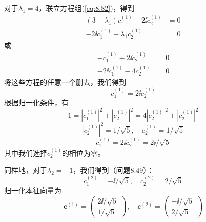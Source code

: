 \begin{examplebox}
        对于$\lambda_1=4$，联立方程组(\ref{eq:8.82})，得到
        \begin{equation*}
            \begin{aligned}
                \left(3-\lambda_1\right)c_1^{\left(1\right)} + 2\ii c_2^{\left(1\right)} &= 0 \\
                -2\ii c_1^{\left(1\right)} - \lambda_1 c_2^{\left(1\right)} &= 0
            \end{aligned}
        \end{equation*}
        或
        \begin{equation*}
            \begin{aligned}
                -c_1^{\left(1\right)} + 2\ii c_2^{\left(1\right)} &= 0 \\
                -2\ii c_1^{\left(1\right)} - 4c_2^{\left(1\right)} &= 0
            \end{aligned}
        \end{equation*}
        将这些方程的任意一个删去，我们得到
        \begin{equation*}
            c_1^{\left(1\right)} = 2\ii c_2^{\left(1\right)}
        \end{equation*}
        根据归一化条件，有
        \begin{equation*}
            1 = |c_1^{\left(1\right)}|^2 + |c_2^{\left(1\right)}|^2 = 4|c_2^{\left(1\right)}|^2 + |c_2^{\left(1\right)}|^2
        \end{equation*}
        \begin{equation*}
            \left|c_2^{\left(1\right)}\right|^2 = 1/\sqrt{5}, \quad c_2^{\left(1\right)} = 1/\sqrt{5}
        \end{equation*}
        \begin{equation*}
            c_1^{\left(1\right)} = 2\ii c_2^{\left(1\right)} = 2\ii /\sqrt{5}
        \end{equation*}
        其中我们选择$c_2^{\left(1\right)}$的相位为零。

        同样地，对于$\lambda_2 = -1$，我们得到（问题8.49）：
        \begin{equation*}
            c_1^{\left(2\right)} = -\ii /\sqrt{5}, \quad c_2^{\left(2\right)} = 2/\sqrt{5}
        \end{equation*}
        归一化本征向量为
        \begin{equation*}
            \mathbf{c}^{\left(1\right)} = \begin{pmatrix}
                2\ii /\sqrt{5} \\
                1/\sqrt{5}
            \end{pmatrix}, \quad \mathbf{c}^{\left(2\right)} = \begin{pmatrix}
                -\ii /\sqrt{5} \\
                2/\sqrt{5}
            \end{pmatrix}
        \end{equation*}


\end{examplebox}
